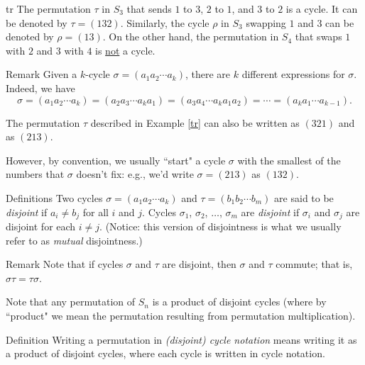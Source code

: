 \begin{example}{tr} The permutation $\tau$ in $S_3$ that sends $1$ to $3$, $2$ to $1$, and $3$ to $2$ is a cycle. It can be denoted by $\tau =(132)$.
Similarly, the cycle $\rho$ in $S_3$ swapping $1$ and $3$ can be denoted by $\rho=(13)$. On the other hand, the permutation in $S_4$ that swaps $1$ with $2$ and $3$ with $4$ is
\underline{not} a cycle. \end{example}

\begin{df}{Remark} Given a $k$-cycle $\sigma=(a_1 a_2\cdots a_k)$, there are $k$ different expressions for $\sigma$.  Indeed, we have
$$\sigma=(a_1 a_2\cdots a_k)=(a_2 a_3 \cdots a_k a_1)=(a_3 a_4 \cdots a_k a_1 a_2)=\cdots = (a_k a_1 \cdots a_{k-1}).$$\end{df}

\begin{example}{} The permutation $\tau$ described in Example \ref{tr} can also be written as $(321)$ and as $(213)$. \end{example}

 However, by convention, we usually ``start" a cycle $\sigma$
with the smallest of the numbers that $\sigma$ doesn't fix: e.g.,
we'd write $\sigma=(213)$ as $(132)$.

\begin{df}{Definitions} Two cycles $\sigma=(a_1 a_2 \cdots a_k)$ and $\tau=(b_1
b_2 \cdots b_m)$ are said to be \textit{disjoint} if $a_i \neq
b_j$ for all $i$ and $j$. Cycles $\sigma_1$,
$\sigma_2$, $\ldots$, $\sigma_m$ are \textit{disjoint} if $\sigma_i$
and $\sigma_j$ are disjoint for each $i \neq j$. (Notice: this
version of disjointness is what we usually refer to as \textit{mutual} disjointness.)\end{df}


\begin{df}{Remark} Note that if cycles $\sigma$ and $\tau$ are disjoint, then $\sigma$ and $\tau$ commute; that is, $\sigma \tau=\tau \sigma$.\end{df}



Note that any permutation of $S_n$ is a product of disjoint cycles (where by ``product" we mean the permutation resulting from permutation multiplication).

\begin{df}{Definition} Writing a permutation in \textit{(disjoint)
cycle notation} means writing it as a product of disjoint
cycles, where each cycle is written in cycle notation.\end{df}

